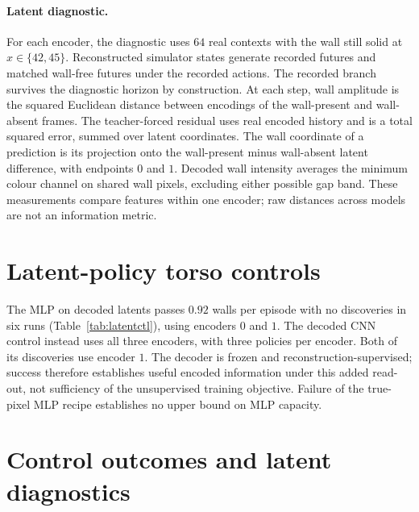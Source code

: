 \paragraph{Latent diagnostic.} For each encoder, the diagnostic uses $64$ real contexts with the
wall still solid at $x\in\{42,45\}$. Reconstructed simulator states generate recorded futures and
matched wall-free futures under the recorded actions. The recorded branch survives the diagnostic
horizon by construction. At each step, wall amplitude is the squared Euclidean distance between
encodings of the wall-present and wall-absent frames. The teacher-forced residual uses real encoded
history and is a total squared error, summed over latent coordinates.
The wall coordinate of a prediction is its projection onto the wall-present minus wall-absent
latent difference, with endpoints $0$ and $1$. Decoded wall intensity averages the minimum colour
channel on shared wall pixels, excluding either possible gap band. These measurements compare
features within one encoder; raw distances across models are not an information metric.

\section{Latent-policy torso controls}
\label{app:latentctl}

The MLP on decoded latents passes $0.92$ walls per episode with no discoveries in six runs
(Table~\ref{tab:latentctl}), using encoders $0$ and $1$. The decoded CNN control instead uses all
three encoders, with three policies per encoder. Both of its discoveries use encoder $1$.
The decoder is frozen and reconstruction-supervised; success therefore establishes useful encoded
information under this added read-out, not sufficiency of the unsupervised training objective.
Failure of the true-pixel MLP recipe establishes no upper bound on MLP capacity.

\begin{table}[ht]
\centering
\caption{Real-gate observation and torso controls: final walls per episode and survival, mean
$\pm$ standard deviation over policies; discovery means final survival above $50\%$.
All policies use $1{,}499{,}136$ real transitions.}
\label{tab:latentctl}
\end{table}

\section{Control outcomes and latent diagnostics}
\label{app:round2}

